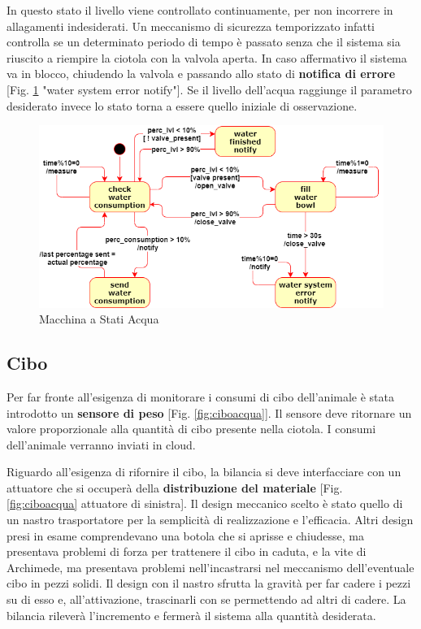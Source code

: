     In questo stato il livello viene controllato continuamente, per non incorrere in allagamenti indesiderati. 
    Un meccanismo di sicurezza temporizzato infatti controlla se un determinato periodo di tempo è passato senza che il sistema sia riuscito a riempire la ciotola con la valvola aperta. In caso affermativo il sistema va in blocco, chiudendo la valvola e passando allo stato di \textbf{notifica di errore} [Fig. \ref{fig:statediagramWater} "water system error notify"]. 
    Se il livello dell'acqua raggiunge il parametro desiderato invece lo stato torna a essere quello iniziale di osservazione.
    
    \begin{figure}[H]
        \caption{Macchina a Stati Acqua}
        \label{fig:statediagramWater}
        \centering
        \includegraphics[width=1\textwidth]{DrawIo/stateDiagramWater.png}
    \end{figure}
    
    
    
    \subsection{Cibo}
    Per far fronte all'esigenza di monitorare i consumi di cibo dell'animale è stata introdotto un \textbf{sensore di peso} [Fig. \ref{fig:ciboacqua}]. Il sensore deve ritornare un valore proporzionale alla quantità di cibo presente nella ciotola. I consumi dell'animale verranno inviati in cloud. 
    
    Riguardo all'esigenza di rifornire il cibo, la bilancia si deve interfacciare con un attuatore che si occuperà della \textbf{distribuzione del materiale} [Fig. \ref{fig:ciboacqua} attuatore di sinistra]. Il design meccanico scelto è stato quello di un nastro trasportatore per la semplicità di realizzazione e l'efficacia. Altri design presi in esame comprendevano una botola che si aprisse e chiudesse, ma presentava problemi di forza per trattenere il cibo in caduta, e la vite di Archimede, ma presentava problemi nell'incastrarsi nel meccanismo dell'eventuale cibo in pezzi solidi. Il design con il nastro sfrutta la gravità per far cadere i pezzi su di esso e, all'attivazione, trascinarli con se permettendo ad altri di cadere. 
    La bilancia rileverà l'incremento e fermerà il sistema alla quantità desiderata.
    

